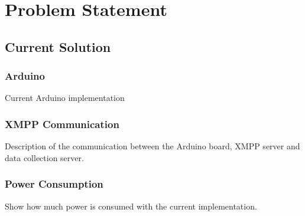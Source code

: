 
\chapter{Problem Statement} %



\ifpdf
    \graphicspath{{X/figures/PNG/}{X/figures/PDF/}{X/figures/}}
\else
    \graphicspath{{X/figures/EPS/}{X/figures/}}
\fi


\section{Current Solution}

\subsection{Arduino}
Current Arduino implementation

\subsection{XMPP Communication}
Description of the communication between the Arduino board, XMPP server and data collection server.

\subsection{Power Consumption}
Show how much power is consumed with the current implementation. 



